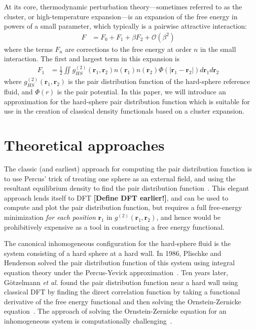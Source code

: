 \documentclass[letterpaper,twocolumn,amsmath,amssymb,pre,aps,10pt]{revtex4-1}
\newcommand{\red}[1]{{\bf \color{red} #1}}
\newcommand{\rr}{\textbf{r}}
\newcommand{\fixme}[1]{\red{[#1]}}
\begin{document}
At its core, thermodynamic perturbation theory---sometimes referred to
as the cluster, or high-temperature expansion---is an expansion of the
free energy in powers of a small parameter, which typically is a
pairwise attractive interaction:
\begin{align}
  F &= F_0 + F_1 + \beta F_2 + \mathcal{O}(\beta^2)
\end{align}
where the terms $F_n$ are corrections to the free energy at order $n$
in the small interaction.  The first and largest term in this
expansion is
\begin{align}
  F_1 &= \tfrac12 \iint g^{(2)}_{HS}(\rr_1,\rr_2)n(\rr_1)n(\rr_2)\Phi(|\rr_1-\rr_2|) d\rr_1d\rr_2
\end{align}
where $g^{(2)}_{HS}(\rr_1,\rr_2)$ is the pair distribution function of
the hard-sphere reference fluid, and $\Phi(r)$ is the pair potential.
In this paper, we will introduce an approximation for the hard-sphere
pair distribution function which is suitable for use in the creation
of classical density functionals based on a cluster expansion.

\section{Theoretical approaches}

The classic (and earliest) approach for computing the pair
distribution function is to use Percus' trick of treating one sphere
as an external field, and using the resultant equilibrium density to
find the pair distribution function~\cite{hansen2006theory}.  This
elegant approach lends itself to DFT \fixme{Define DFT earlier!}, and can be used to compute and
plot the pair distribution function, but requires a full free-energy
minimization \emph{for each position} $\rr_1$ in
$g^{(2)}(\rr_1,\rr_2)$, and hence would be prohibitively expensive as
a tool in constructing a free energy functional.

The canonical inhomogeneous configuration for the hard-sphere
fluid is the system consisting of a hard sphere at a hard wall.  In
1986, Plischke and Henderson solved the pair distribution function of
this system using integral equation theory under the Percus-Yevick
approximation~\cite{plischke1986pair}.  Ten years later,
G{\"o}tzelmann \emph{et al.} found the pair distribution function near
a hard wall using classical DFT by finding the direct correlation
function by taking a functional derivative of the free energy
functional and then solving the Ornstein-Zernicke
equation~\cite{gotzelmann1996structure}.  The approach of solving the
Ornstein-Zernicke equation for an inhomogeneous system is
computationally challenging~\cite{paul2003variational}.
\end{document}
